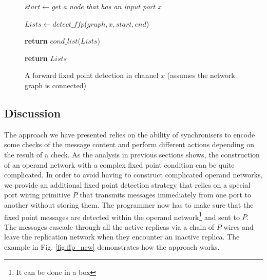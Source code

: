 \begin{figure}
{\begin{minipage}{\dimexpr\linewidth-2\fboxsep-2\fboxrule\relax}
\begin{algorithmic}[1]
    \State $start\gets$\emph{get a node that has an input port x}

    \State $Lists\gets detect\_ffp$($graph, x, start, end$) %
      
      \State \textbf{return} $cond\_list$($Lists$)

    \EndIf
    \State \textbf{return} $Lists$
  \EndIf

\EndFunction
\end{algorithmic}
\end{minipage}%
}
\caption{A forward fixed point detection in channel $x$ (assumes the network graph is connected)\label{fig:ffp_detect}}
\end{figure}


    \subsection{Discussion}
The approach we have presented relies on the ability of synchronisers to encode some checks of the message content and perform different actions depending on the result of a check. As the analysis in previous sections shows, the construction of an operand network with a complex fixed point condition can be quite complicated. In order to avoid having to construct complicated operand networks, we provide an additional fixed point detection strategy that relies on a special port wiring primitive $P$ that transmits messages immediately from one port to another without storing them. The programmer now has to make sure that the fixed point messages are detected within the operand network\footnote{It can be done in a box} and sent to $P$. The messages cascade through all the active replicas via a chain of $P$ wires and leave the replication network when they encounter an inactive replica. The example in Fig. \ref{fig:ffp_new} demonstrates how the approach works.

